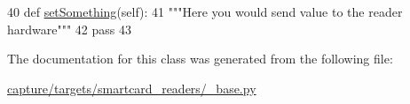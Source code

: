 \begin{DoxyCode}
40     \textcolor{keyword}{def }\hyperlink{classsoftware_1_1chipwhisperer_1_1capture_1_1targets_1_1smartcard__readers_1_1__base_1_1ReaderTemplate_a6803750fc338825d0ce9285c8953a975}{setSomething}(self):
41         \textcolor{stringliteral}{"""Here you would send value to the reader hardware"""}
42         \textcolor{keywordflow}{pass}
43 
\end{DoxyCode}


The documentation for this class was generated from the following file\+:\begin{DoxyCompactItemize}
\item 
\hyperlink{capture_2targets_2smartcard__readers_2__base_8py}{capture/targets/smartcard\+\_\+readers/\+\_\+base.\+py}\end{DoxyCompactItemize}
